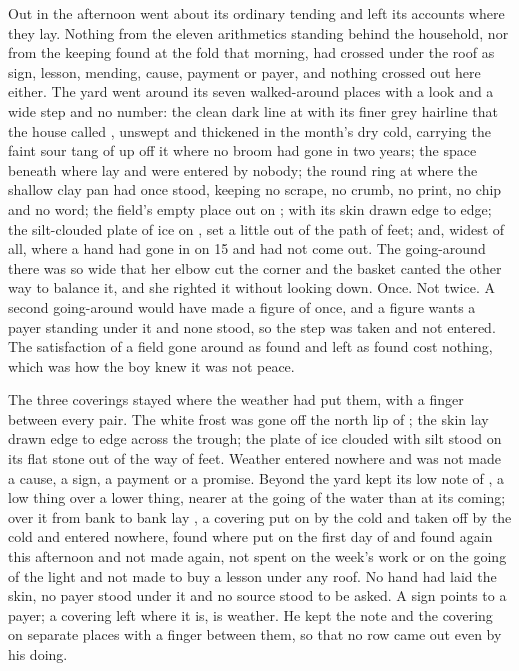 Out in  the afternoon went about its ordinary tending and left its accounts where they lay. Nothing from the eleven arithmetics standing behind the household, nor from the keeping found at the fold that morning, had crossed under the roof as sign, lesson, mending, cause, payment or payer, and nothing crossed out here either. The yard went around its seven walked-around places with a look and a wide step and no number: the clean dark line at  with its finer grey hairline that the house called , unswept and thickened in the month's dry cold, carrying the faint sour tang of  up off it where no broom had gone in two years; the space beneath  where  lay and were entered by nobody; the round ring at  where the shallow clay pan had once stood, keeping no scrape, no crumb, no print, no chip and no word; the field's empty place out on ;  with its skin drawn edge to edge; the silt-clouded plate of ice on , set a little out of the path of feet; and, widest of all,  where a hand had gone in on  15 and had not come out. The going-around there was so wide that her elbow cut the corner and the basket canted the other way to balance it, and she righted it without looking down. Once. Not twice. A second going-around would have made a figure of once, and a figure wants a payer standing under it and none stood, so the step was taken and not entered. The satisfaction of a field gone around as found and left as found cost nothing, which was how the boy knew it was not peace.

The three coverings stayed where the weather had put them, with a finger between every pair. The white frost was gone off the north lip of ; the skin lay drawn edge to edge across the trough; the plate of ice clouded with silt stood on its flat stone out of the way of feet. Weather entered nowhere and was not made a cause, a sign, a payment or a promise. Beyond the yard  kept its low note of , a low thing over a lower thing, nearer at the going of the water than at its coming; over it from bank to bank lay , a covering put on by the cold and taken off by the cold and entered nowhere, found where put on the first day of  and found again this afternoon and not made again, not spent on the week's work or on the going of the light and not made to buy a lesson under any roof. No hand had laid the skin, no payer stood under it and no source stood to be asked. A sign points to a payer; a covering left where it is, is weather. He kept the note and the covering on separate places with a finger between them, so that no row came out even by his doing.

